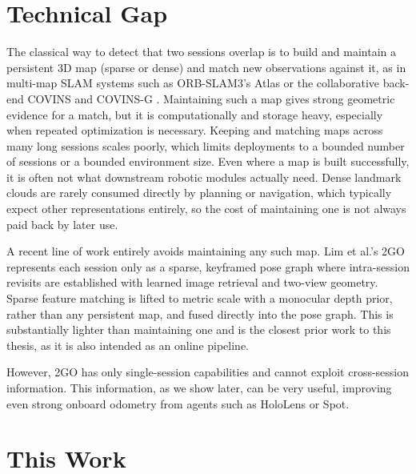\section{Technical Gap}

The classical way to detect that two sessions overlap is to build and maintain a persistent 3D map (sparse or dense) and match new observations against it, as in multi-map SLAM systems such as ORB-SLAM3's Atlas \cite{elvira2019orbslamatlasrobustaccuratemultimap} or the collaborative back-end COVINS \cite{covins} and COVINS-G \cite{covins-g}. Maintaining such a map gives strong geometric evidence for a match, but it is computationally and storage heavy, especially when repeated optimization is necessary. Keeping and matching maps across many long sessions scales poorly, which limits deployments to a bounded number of sessions or a bounded environment size. Even where a map is built successfully, it is often not what downstream robotic modules actually need. Dense landmark clouds are rarely consumed directly by planning or navigation, which typically expect other representations entirely, so the cost of maintaining one is not always paid back by later use.

A recent line of work entirely avoids maintaining any such map. Lim et al.'s 2GO \cite{lim2025twogo} represents each session only as a sparse, keyframed pose graph where intra-session revisits are established with learned image retrieval and two-view geometry. Sparse feature matching is lifted to metric scale with a monocular depth prior, rather than any persistent map, and fused directly into the pose graph. This is substantially lighter than maintaining one and is the closest prior work to this thesis, as it is also intended as an online pipeline.

However, 2GO has only single-session capabilities and cannot exploit cross-session information. This information, as we show later, can be very useful, improving even strong onboard odometry from agents such as HoloLens or Spot.

\section{This Work}

